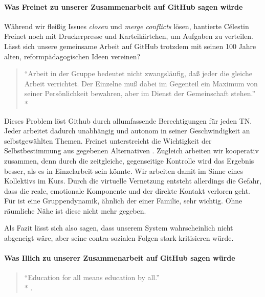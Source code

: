 \paragraph{Was Freinet zu unserer Zusammenarbeit auf GitHub sagen würde}

Während wir fleißig Issues \emph{closen} und \emph{merge conflicts} lösen, hantierte Célestin Freinet noch mit Druckerpresse und Karteikärtchen, um Aufgaben zu verteilen.
Lässt sich unsere gemeinsame Arbeit auf GitHub trotzdem mit seinen 100 Jahre alten, reformpädagogischen Ideen vereinen?

\begin{quote}
	``Arbeit in der Gruppe bedeutet nicht zwangsläufig, daß jeder die gleiche Arbeit verrichtet. Der Einzelne muß dabei im Gegenteil ein Maximum von seiner Persönlichkeit bewahren, aber im Dienst der Gemeinschaft stehen.''\\*
	\parencite[510]{Freinet-2000a}
\end{quote}

Dieses Problem löst Github durch allumfassende Berechtigungen für jeden TN.
Jeder arbeitet dadurch unabhängig und autonom in seiner Geschwindigkeit an selbstgewählten Themen.
Freinet unterstreicht die Wichtigkeit der Selbstbestimmung aus gegebenen Alternativen \parencite[vgl.][495]{Freinet-2000a}.
Zugleich arbeiten wir kooperativ zusammen, denn durch die zeitgleiche, gegenseitige Kontrolle wird das Ergebnis besser, als es in Einzelarbeit sein könnte.
Wir arbeiten damit im Sinne eines Kollektivs im Kurs.
Durch die virtuelle Vernetzung entsteht allerdings die Gefahr, dass die reale, emotionale Komponente und der direkte Kontakt verloren geht.
Für \citeauthor{Freinet-2000a} ist eine Gruppendynamik, ähnlich der einer Familie, sehr wichtig.
Ohne räumliche Nähe ist diese nicht mehr gegeben.

Als Fazit lässt sich also sagen, dass \citeauthor{Freinet-2000a} unserem System wahrscheinlich nicht abgeneigt wäre, aber seine contra-sozialen Folgen stark kritisieren würde.


\paragraph{Was Illich zu unserer Zusammenarbeit auf GitHub sagen würde}

\begin{quote}
	``Education for all means education by all.''\\*
	\parencite[17]{Illich-1971}.
\end{quote}

